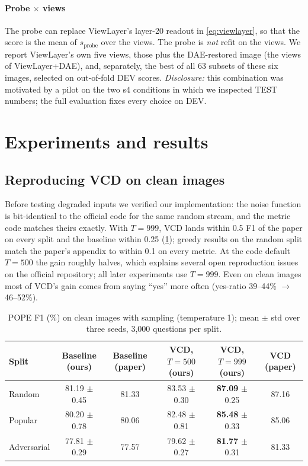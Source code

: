 \documentclass[10pt,a4paper]{article}
\newcommand{\ours}{ViewLayer}
\begin{document}
\paragraph{Probe $\times$ views} The probe can replace \ours{}'s layer-20 readout in \cref{eq:viewlayer}, so that the score is the mean of $s_{\text{probe}}$ over the views. The probe is \emph{not} refit on the views. We report \ours{}'s own five views, those plus the DAE-restored image (the views of \ours+DAE), and, separately, the best of all 63 subsets of these six images, selected on out-of-fold DEV scores. \emph{Disclosure:} this combination was motivated by a pilot on the two s4 conditions in which we inspected TEST numbers; the full evaluation fixes every choice on DEV.

\section{Experiments and results}

\subsection{Reproducing VCD on clean images}\label{sec:repro}
Before testing degraded inputs we verified our implementation: the noise function is bit-identical to the official code for the same random stream, and the metric code matches theirs exactly. With $T{=}999$, VCD lands within 0.5 F1 of the paper on every split and the baseline within 0.25 (\cref{tab:repro}); greedy results on the random split match the paper's appendix to within 0.1 on every metric. At the code default $T{=}500$ the gain roughly halves, which explains several open reproduction issues on the official repository; all later experiments use $T{=}999$. Even on clean images most of VCD's gain comes from saying ``yes'' more often (yes-ratio 39--44\% $\to$ 46--52\%).

\begin{table}[h]
\centering\small
\caption{POPE F1 (\%) on clean images with sampling (temperature 1); mean $\pm$ std over three seeds, 3{,}000 questions per split.}
\label{tab:repro}
\begin{tabular}{@{}lccccc@{}}
\toprule
Split & Baseline (ours) & Baseline (paper) & VCD, $T{=}500$ (ours) & VCD, $T{=}999$ (ours) & VCD (paper)\\
\midrule
Random      & 81.19 $\pm$ 0.45 & 81.33 & 83.53 $\pm$ 0.30 & \textbf{87.09} $\pm$ 0.25 & 87.16\\
Popular     & 80.20 $\pm$ 0.78 & 80.06 & 82.48 $\pm$ 0.81 & \textbf{85.48} $\pm$ 0.33 & 85.06\\
Adversarial & 77.81 $\pm$ 0.29 & 77.57 & 79.62 $\pm$ 0.27 & \textbf{81.77} $\pm$ 0.31 & 81.33\\
\bottomrule
\end{tabular}
\end{table}
\end{document}
